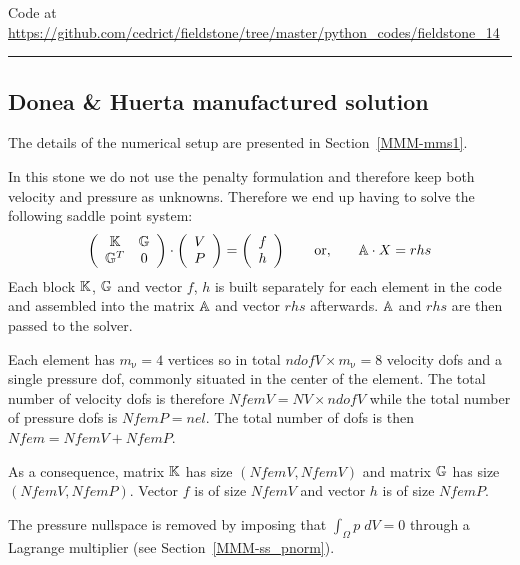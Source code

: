 

\begin{center}
Code at \url{https://github.com/cedrict/fieldstone/tree/master/python_codes/fieldstone_14}
\end{center}

\par\noindent\rule{\textwidth}{0.4pt}

\subsection*{Donea \& Huerta manufactured solution}

The details of the numerical setup are presented in Section~\ref{MMM-mms1}.

In this stone we do not use the penalty formulation and therefore 
keep both velocity and pressure as unknowns. Therefore we end up having to solve 
the following saddle point system:
\[
\left(
\begin{array}{cc}
{\mathbb{K}} & {\mathbb{G}} \\ {\mathbb{G}}^T & 0 
\end{array}
\right)
\cdot
\left(
\begin{array}{c}
V \\ P
\end{array}
\right)
=
\left(
\begin{array}{c}
 f \\ h
\end{array}
\right)
\quad\quad
{\rm or,}
\quad\quad
{\mathbb{A}} \cdot X = rhs
\]
Each block ${\mathbb{K}}$, ${\mathbb{G}}$ and vector $f$, $h$ is built separately for each element 
in the code and assembled into 
the matrix ${\mathbb{A}}$ and vector $rhs$ afterwards. ${\mathbb{A}}$ and $rhs$ are then passed to the solver. 

Each element has $m_\upnu=4$ vertices so in total $ndofV\times m_\upnu=8$ 
velocity dofs and a single 
pressure dof, commonly situated in the center of the element. The total number of 
velocity dofs is therefore $NfemV=NV \times ndofV$ while the total number of
pressure dofs is $NfemP=nel$. The total number of dofs is then $Nfem=NfemV+NfemP$.

As a consequence, matrix ${\mathbb{K}}$ has size $(NfemV,NfemV)$ and matrix ${\mathbb{G}}$ has size $(NfemV,NfemP)$.
Vector $f$ is of size $NfemV$ and vector $h$ is of size $NfemP$.  

The pressure nullspace is removed by imposing that $\int_\Omega p \; dV =0$ through 
a Lagrange multiplier (see Section~\ref{MMM-ss_pnorm}).

